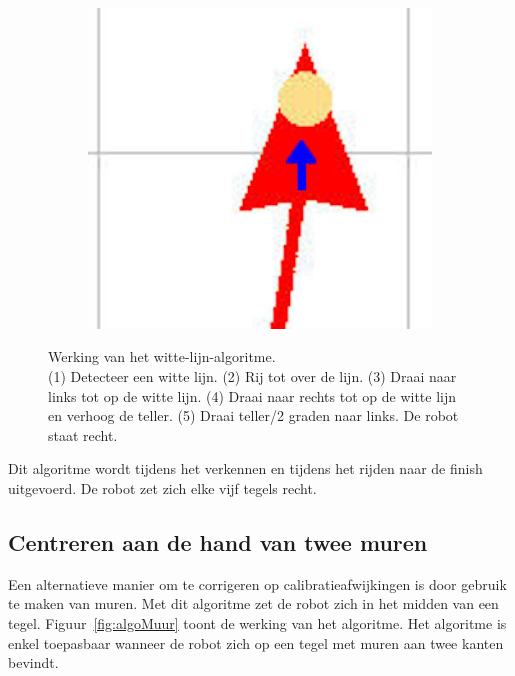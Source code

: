 \documentclass[eind]{penoverslag}
\begin{document}
\begin{figure}
\begin{subfigure}[hb]{0.2\textwidth}
        \end{subfigure}%
        \begin{subfigure}[hb]{0.2\textwidth}
                \centering
                \includegraphics[width=\textwidth]{witte_lijn5}
        \end{subfigure}
 \caption[Werking van het witte-lijn-algoritme.]{Werking van het witte-lijn-algoritme.\\(1) Detecteer een witte lijn. (2) Rij tot over de lijn. (3) Draai naar links tot op de witte lijn. (4) Draai naar rechts tot op de witte lijn en verhoog de teller. (5) Draai teller/2 graden naar links. De robot staat recht.}
\label{fig:algoWitteL}
\end{figure}

Dit algoritme wordt tijdens het verkennen en tijdens het rijden naar de finish uitgevoerd. De robot zet zich elke vijf tegels recht.

\subsection{Centreren aan de hand van twee muren} %
\label{ssec:algoMuren}
Een alternatieve manier om te corrigeren op calibratieafwijkingen is door gebruik te maken van muren. Met dit algoritme zet de robot zich in het midden van een tegel. Figuur~\ref{fig:algoMuur} toont de werking van het algoritme. Het algoritme is enkel toepasbaar wanneer de robot zich op een tegel met muren aan twee kanten bevindt.
\end{document}
